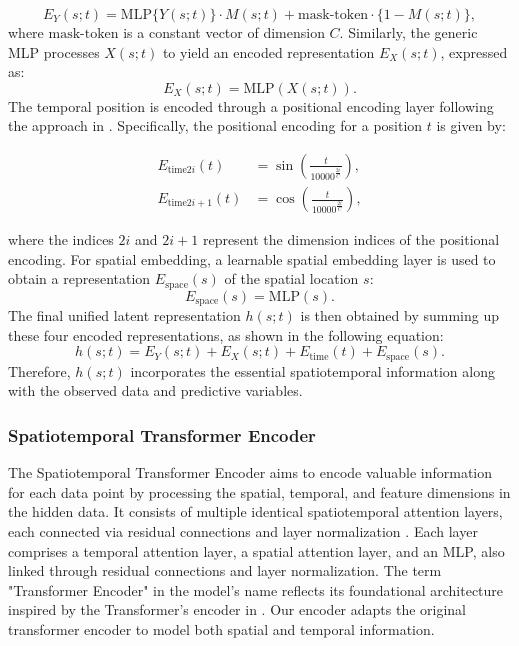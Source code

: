 \documentclass[11pt]{article}
\begin{document}
\begin{equation}
    E_{Y}(s;t) = \text{MLP}\{Y(s;t)\}\cdot M(s;t) + \text{mask-token} \cdot \{1-M(s;t)\},
\end{equation}
where $\text{mask-token}$ is a constant vector of dimension $C$. Similarly, the generic MLP processes $X(s;t)$ to yield an encoded representation $E_{X}(s;t)$, expressed as:
\begin{equation}
	E_{X}(s;t) = \text{MLP}(X(s;t)).
\end{equation}
The temporal position is encoded through a positional encoding layer following the approach in \citep{vaswani2017attention}. Specifically, the positional encoding for a position $t$ is given by:

\begin{align}
    E_{\text{time}2i}(t) &= \sin\left(\frac{t}{10000^{\frac{2i}{C}}}\right),\\
    E_{\text{time}2i+1}(t) &= \cos\left(\frac{t}{10000^{\frac{2i}{C}}}\right),
\end{align}

where the indices $2i$ and $2i+1$ represent the dimension indices of the positional encoding.
For spatial embedding, a learnable spatial embedding layer is used to obtain a representation $E_{\text{space}}(s)$ of the spatial location $s$:
\begin{equation}
	E_{\text{space}}(s) = \text{MLP}(s).
\end{equation}
The final unified latent representation $h(s;t)$ is then obtained by summing up these four encoded representations, as shown in the following equation:
\begin{equation}
	h(s;t) = E_{Y}(s;t) + E_{X}(s;t) + E_{\text{time}}(t) + E_{\text{space}}(s).
\end{equation}
 Therefore, $h(s;t)$ incorporates the essential spatiotemporal information along with the observed data and predictive variables.






\subsubsection*{Spatiotemporal Transformer Encoder}
The Spatiotemporal Transformer Encoder aims to encode valuable information for each data point by processing the spatial, temporal, and feature dimensions in the hidden data. It consists of multiple identical spatiotemporal attention layers, each connected via residual connections and layer normalization  \citep{ba2016layer}. Each layer comprises a temporal attention layer, a spatial attention layer, and an MLP, also linked through residual connections and layer normalization. The term "Transformer Encoder" in the model's name reflects its foundational architecture inspired by the Transformer's encoder in \citet{vaswani2017attention}. Our encoder adapts the original transformer encoder to model both spatial and temporal information. 
\end{document}
